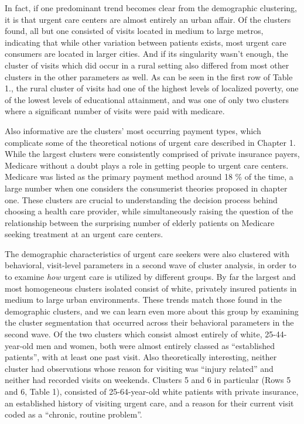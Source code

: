 \documentclass[12pt,twoside]{reedthesis}
\begin{document}
  In fact, if one predominant trend becomes clear from the demographic
  clustering, it is that urgent care centers are almost entirely an urban
  affair. Of the clusters found, all but one consisted of visits located
  in medium to large metros, indicating that while other variation between
  patients exists, most urgent care consumers are located in larger
  cities. And if its singularity wasn't enough, the cluster of visits
  which did occur in a rural setting also differed from most other
  clusters in the other parameters as well. As can be seen in the first
  row of Table 1., the rural cluster of visits had one of the highest
  levels of localized poverty, one of the lowest levels of educational
  attainment, and was one of only two clusters where a significant number
  of visits were paid with medicare.
  
  Also informative are the clusters' most occurring payment types, which
  complicate some of the theoretical notions of urgent care described in
  Chapter 1. While the largest clusters were consistently comprised of
  private insurance payers, Medicare without a doubt plays a role in
  getting people to urgent care centers. Medicare was listed as the
  primary payment method around 18 \% of the time, a large number when one
  considers the consumerist theories proposed in chapter one. These
  clusters are crucial to understanding the decision process behind
  choosing a health care provider, while simultaneously raising the
  question of the relationship between the surprising number of elderly
  patients on Medicare seeking treatment at an urgent care centers.
  
  The demographic characteristics of urgent care seekers were also
  clustered with behavioral, visit-level parameters in a second wave of
  cluster analysis, in order to to examine \emph{how} urgent care is
  utilized by different groups. By far the largest and most homogeneous
  clusters isolated consist of white, privately insured patients in medium
  to large urban environments. These trends match those found in the
  demographic clusters, and we can learn even more about this group by
  examining the cluster segmentation that occurred across their behavioral
  parameters in the second wave. Of the two clusters which consist almost
  entirely of white, 25-44-year-old men and women, both were almost
  entirely classed as ``established patients'', with at least one past
  visit. Also theoretically interesting, neither cluster had observations
  whose reason for visiting was ``injury related'' and neither had
  recorded visits on weekends. Clusters 5 and 6 in particular (Rows 5 and
  6, Table 1), consisted of 25-64-year-old white patients with private
  insurance, an established history of visiting urgent care, and a reason
  for their current visit coded as a ``chronic, routine problem''.
  
\end{document}
